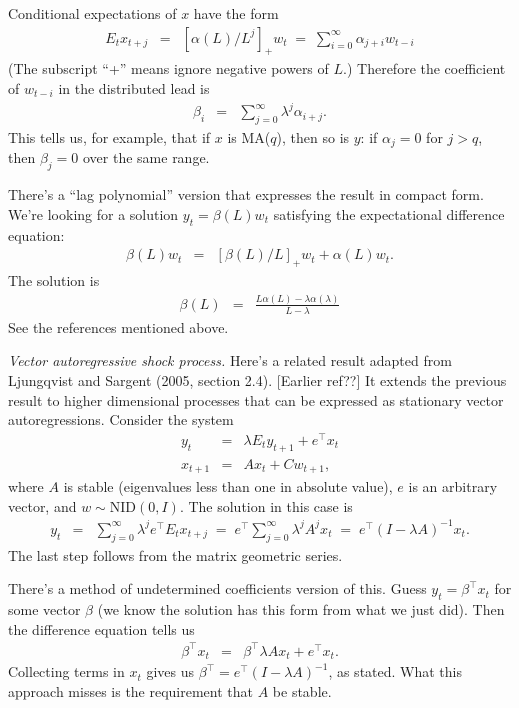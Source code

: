 \documentclass[11pt]{article}
\newcounter{tab}
\begin{document}
{Conditional expectations of $x$ have the form
\begin{eqnarray*}
    E_t x_{t+j}  &=&  [\alpha(L)/L^j]_+ w_t
                 \;=\;  \sum_{i=0}^\infty \alpha_{j+i} w_{t-i}
\end{eqnarray*}
(The subscript ``+'' means ignore negative powers of $L$.)
Therefore the coefficient of $ w_{t-i}$ in the distributed lead is
\begin{eqnarray*}
    \beta_i &=& \sum_{j=0}^\infty \lambda^j \alpha_{i+j} .
\end{eqnarray*}
This tells us, for example, that if $x$ is MA($q$), then so is $y$:
if $ \alpha_{j} = 0$ for $ j > q $,
then $ \beta_j = 0 $ over the same range.

There's a ``lag polynomial'' version that expresses the result in
compact form.
We're looking for a solution $y_t = \beta(L) w_t$ satisfying the
expectational difference equation:
\begin{eqnarray*}
    \beta(L) w_t &=& [\beta(L)/L]_+ w_t + \alpha(L) w_t  .
\end{eqnarray*}
The solution is
\begin{eqnarray*}
    \beta(L) &=&  \frac{L\alpha(L) - \lambda \alpha(\lambda)}{L-\lambda}
\end{eqnarray*}
See the references mentioned above.

{\it Vector autoregressive shock process.\/}
Here's a related result adapted from
Ljungqvist and Sargent (2005, section 2.4).  [Earlier ref??]
It extends the previous result to higher dimensional processes
that can be expressed as stationary vector autoregressions.
Consider the system
\begin{eqnarray*}
    y_t &=&    \lambda E_t y_{t+1} + e^\top x_{t}  \\
    x_{t+1}  &=&  A x_t + C w_{t+1} ,
\end{eqnarray*}
where
$A$ is stable (eigenvalues less than one in absolute value),
$e$ is an arbitrary vector,
and  $w \sim \mbox{NID}(0,I)$.
The solution in this case is
\begin{eqnarray*}
    y_t &=&  \sum_{j=0}^\infty \lambda^j  e^\top E_t x_{t+j}
        \;=\;  e^\top \sum_{j=0}^\infty \lambda^j  A^j x_{t}
        \;=\;  e^\top (I-\lambda A)^{-1} x_t.
\end{eqnarray*}
The last step follows from the matrix geometric series.

There's a method of undetermined coefficients version of this.
Guess $ y_t = \beta^\top x_t$ for some vector $\beta$
(we know the solution has this form from what we just did).
Then the difference equation tells us
\begin{eqnarray*}
    \beta^\top x_t &=&  \beta^\top \lambda A x_t + e^\top x_t .
\end{eqnarray*}
Collecting terms in $x_t$ gives us
$ \beta^\top =  e^\top (I-\lambda A)^{-1} $, as stated.
What this approach misses is the requirement that $A$ be stable.

}
\end{document}
